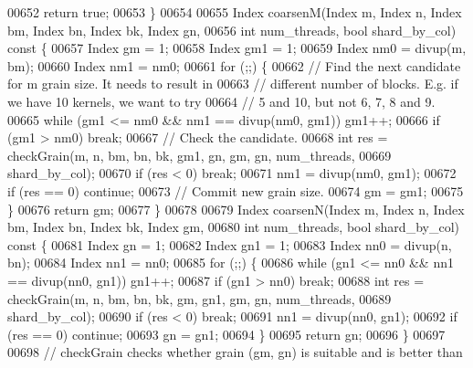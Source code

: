 \begin{DoxyCode}
00652     \textcolor{keywordflow}{return} \textcolor{keyword}{true};
00653   \}
00654 
00655   Index coarsenM(Index m, Index n, Index bm, Index bn, Index bk, Index gn,
00656                  \textcolor{keywordtype}{int} num\_threads, \textcolor{keywordtype}{bool} shard\_by\_col)\textcolor{keyword}{ const }\{
00657     Index gm = 1;
00658     Index gm1 = 1;
00659     Index nm0 = divup(m, bm);
00660     Index nm1 = nm0;
00661     \textcolor{keywordflow}{for} (;;) \{
00662       \textcolor{comment}{// Find the next candidate for m grain size. It needs to result in}
00663       \textcolor{comment}{// different number of blocks. E.g. if we have 10 kernels, we want to try}
00664       \textcolor{comment}{// 5 and 10, but not 6, 7, 8 and 9.}
00665       \textcolor{keywordflow}{while} (gm1 <= nm0 && nm1 == divup(nm0, gm1)) gm1++;
00666       \textcolor{keywordflow}{if} (gm1 > nm0) \textcolor{keywordflow}{break};
00667       \textcolor{comment}{// Check the candidate.}
00668       \textcolor{keywordtype}{int} res = checkGrain(m, n, bm, bn, bk, gm1, gn, gm, gn, num\_threads,
00669                            shard\_by\_col);
00670       \textcolor{keywordflow}{if} (res < 0) \textcolor{keywordflow}{break};
00671       nm1 = divup(nm0, gm1);
00672       \textcolor{keywordflow}{if} (res == 0) \textcolor{keywordflow}{continue};
00673       \textcolor{comment}{// Commit new grain size.}
00674       gm = gm1;
00675     \}
00676     \textcolor{keywordflow}{return} gm;
00677   \}
00678 
00679   Index coarsenN(Index m, Index n, Index bm, Index bn, Index bk, Index gm,
00680                  \textcolor{keywordtype}{int} num\_threads, \textcolor{keywordtype}{bool} shard\_by\_col)\textcolor{keyword}{ const }\{
00681     Index gn = 1;
00682     Index gn1 = 1;
00683     Index nn0 = divup(n, bn);
00684     Index nn1 = nn0;
00685     \textcolor{keywordflow}{for} (;;) \{
00686       \textcolor{keywordflow}{while} (gn1 <= nn0 && nn1 == divup(nn0, gn1)) gn1++;
00687       \textcolor{keywordflow}{if} (gn1 > nn0) \textcolor{keywordflow}{break};
00688       \textcolor{keywordtype}{int} res = checkGrain(m, n, bm, bn, bk, gm, gn1, gm, gn, num\_threads,
00689                            shard\_by\_col);
00690       \textcolor{keywordflow}{if} (res < 0) \textcolor{keywordflow}{break};
00691       nn1 = divup(nn0, gn1);
00692       \textcolor{keywordflow}{if} (res == 0) \textcolor{keywordflow}{continue};
00693       gn = gn1;
00694     \}
00695     \textcolor{keywordflow}{return} gn;
00696   \}
00697 
00698   \textcolor{comment}{// checkGrain checks whether grain (gm, gn) is suitable and is better than}

\end{DoxyCode}
